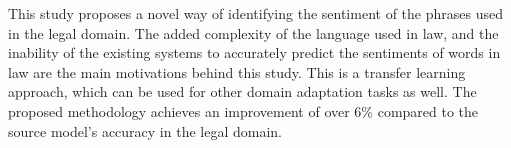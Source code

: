 This study proposes a novel way of identifying the sentiment of the phrases used in the legal domain. The added complexity of the language used in law, and the inability of the existing systems to accurately predict the sentiments of words in law are the main motivations behind this study. This is a transfer learning approach, which can be used for other domain adaptation tasks as well. The proposed methodology achieves an improvement of over 6\% compared to the source model's accuracy in the legal domain.
